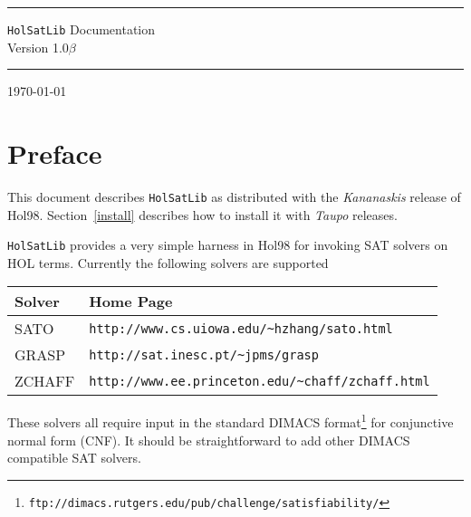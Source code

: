 \documentclass[12pt]{article}
\newcommand\HOL{HOL\xspace}
\begin{document}
\thispagestyle{empty}

\hrule height5pt

\begin{flushleft}\Huge
{\tt HolSatLib} Documentation\\
{\Large Version 1.0$\beta$}
\end{flushleft}

\vspace*{2mm}

\hrule height5pt

\vspace*{1cm}



\vspace*{5mm}

\today

\vfill

{\setlength{\fboxrule}{0.5mm}
\setlength{\fboxsep}{2mm}
}

\vfill

\newpage


\section*{Preface}



This document describes {\tt{HolSatLib}}
as distributed with the {\it Kananaskis\/} release of Hol98. Section~\ref{install}
describes how to install it with {\it Taupo} releases.

{\tt{HolSatLib}} provides a very simple harness in Hol98 for
invoking SAT solvers on \HOL terms. Currently the following
solvers are supported

\medskip

\begin{tabular}{ll}
{\bf Solver} & {\bf Home Page} \\ \hline
SATO & {\small\verb+http://www.cs.uiowa.edu/~hzhang/sato.html+}\\
GRASP & {\small\verb+http://sat.inesc.pt/~jpms/grasp+}\\
ZCHAFF & {\small\verb+http://www.ee.princeton.edu/~chaff/zchaff.html+}
\end{tabular}

\medskip

These solvers all require input in the standard DIMACS 
format\footnote{\small\tt ftp://dimacs.rutgers.edu/pub/challenge/satisfiability/}
for conjunctive normal form (CNF). It should be straightforward to add other
DIMACS compatible SAT solvers.
\end{document}

